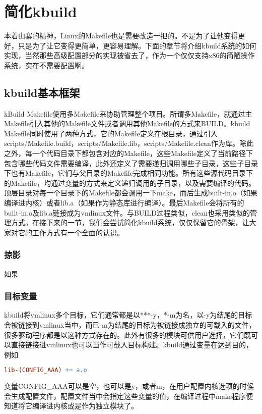 
\section{简化kbuild}
本着山寨的精神，Linux的Makefile也是需要改造一把的。不是为了让他变得更好，只是为了让它变得更简单，更容易理解。下面的章节将介绍kbuild系统的如何实现，当然那些高级配置部分的实现被省去了，作为一个仅仅支持x86的简陋操作系统，实在不需要配置啊。

\subsection{kbuild基本框架}
kBuild Makefile使用多Makefile来协助管理整个项目。所谓多Makefile，就通过主Makefile引入其他的Makefile文件或者调用其他Makefile的方式来BUILD。kbuild Makefile同时使用了两种方式，它的Makefile定义在根目录，通过引入scripts/Makefile.build，scripts/Makefile.lib，scripts/Makefile.clean作为库。除此之外，每一个代码目录下都包含对应的Makefile，这些Makefile定义了当前路径下包含哪些代码文件需要编译，此外还定义了需要递归调用哪些子目录，这些子目录下也有Makefile，它们与父目录的Makefile完成相同功能。所有这些源代码目录下的Makefile，均通过变量的方式来定义递归调用的子目录，以及需要编译的代码。顶层目录对每一个目录下的Makefile都会调用一下make，而后生成built-in.o（如果编译进内核）或者lib.a（如果作为静态库进行编译）。最后Makefile会将所有的built-in.o及lib.a链接成为vmlinux文件。与BUILD过程类似，clean也采用类似的管理方式。在接下来的一节，我们会尝试简化kbuild系统，仅仅保留它的骨架，让大家对它的工作方式有一个全面的认识。

\subsubsection{掠影}
如果

\subsubsection{目标变量}
kbuild将vmlinux多个目标，它们通常都是以***-y，*-m为名，以-y为结尾的目标会被链接到vmlinux当中，而已-m为结尾的目标为被链接成独立的可载入的文件，很多驱动程序都是以这种方式存在的。此外有很多的模块可供用户选择，它们既可以直接链接进vmlinux也可以当作可载入目标构建。kbuild通过变量在达到目的，例如
\begin{lstlisting}[language=make]
lib-(CONFIG_AAA) += a.o
\end{lstlisting}
变量CONFIG\_AAA可以是空，也可以是y，或者m，在用户配置内核选项的时候会生成配置文件，配置文件当中会指定这些变量的值，在编译过程中make程序便知道将它编译进内核或是作为独立模块了。

